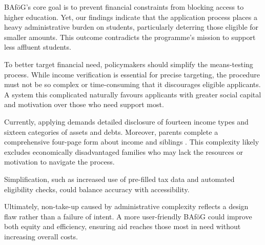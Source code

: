 BAföG’s core goal is to prevent financial constraints from blocking access to higher education. Yet, our findings indicate that the application process places a heavy administrative burden on students, particularly deterring those eligible for smaller amounts. This outcome contradicts the programme’s mission to support less affluent students.

To better target financial need, policymakers should simplify the means-testing process. While income verification is essential for precise targeting, the procedure must not be so complex or time-consuming that it discourages eligible applicants. A system this complicated naturally favours applicants with greater social capital and motivation over those who need support most.

Currently, applying demands detailed disclosure of fourteen income types and sixteen categories of assets and debts. Moreover, parents complete a comprehensive four-page form about income and siblings \citep{fidan_why_2021}. This complexity likely excludes economically disadvantaged families who may lack the resources or motivation to navigate the process.

Simplification, such as increased use of pre-filled tax data and automated eligibility checks, could balance accuracy with accessibility.

Ultimately, non-take-up caused by administrative complexity reflects a design flaw rather than a failure of intent. A more user-friendly BAföG could improve both equity and efficiency, ensuring aid reaches those most in need without increasing overall costs.



%
%


%
%

